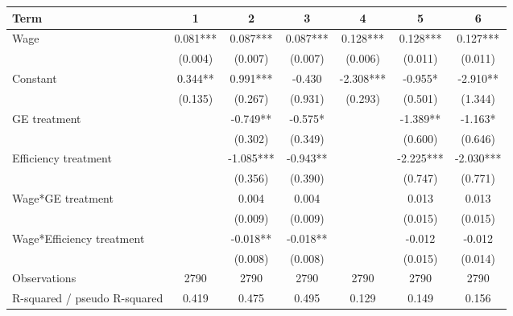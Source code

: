 \begin{tabular}{lcccccc}
\hline
Term & 1 & 2 & 3 & 4 & 5 & 6 \\
\hline
Wage & 0.081*** & 0.087*** & 0.087*** & 0.128*** & 0.128*** & 0.127*** \\
 & (0.004) & (0.007) & (0.007) & (0.006) & (0.011) & (0.011) \\
Constant & 0.344** & 0.991*** & -0.430 & -2.308*** & -0.955* & -2.910** \\
 & (0.135) & (0.267) & (0.931) & (0.293) & (0.501) & (1.344) \\
GE treatment &  & -0.749** & -0.575* &  & -1.389** & -1.163* \\
 &  & (0.302) & (0.349) &  & (0.600) & (0.646) \\
Efficiency treatment &  & -1.085*** & -0.943** &  & -2.225*** & -2.030*** \\
 &  & (0.356) & (0.390) &  & (0.747) & (0.771) \\
Wage*GE treatment &  & 0.004 & 0.004 &  & 0.013 & 0.013 \\
 &  & (0.009) & (0.009) &  & (0.015) & (0.015) \\
Wage*Efficiency treatment &  & -0.018** & -0.018** &  & -0.012 & -0.012 \\
 &  & (0.008) & (0.008) &  & (0.015) & (0.014) \\
Observations & 2790 & 2790 & 2790 & 2790 & 2790 & 2790 \\
R-squared / pseudo R-squared & 0.419 & 0.475 & 0.495 & 0.129 & 0.149 & 0.156 \\
\hline
\end{tabular}
